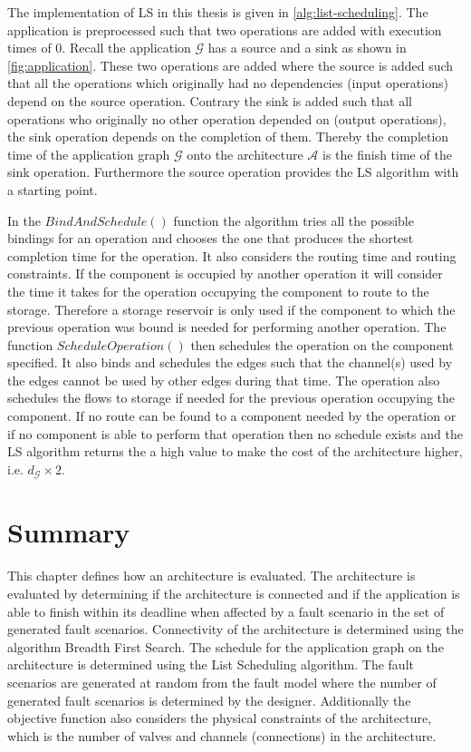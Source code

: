 The implementation of LS in this thesis is given in \autoref{alg:list-scheduling}. The application is preprocessed such that two operations are added with execution times of 0. Recall the application $\mathcal{G}$ has a source and a sink as shown in \autoref{fig:application}. These two operations are added where the source is added such that all the operations which originally had no dependencies (input operations) depend on the source operation. Contrary the sink is added such that all operations who originally no other operation depended on (output operations), the sink operation depends on the completion of them. Thereby the completion time of the application graph $\mathcal{G}$ onto the architecture $\mathcal{A}$ is the finish time of the sink operation. Furthermore the source operation provides the LS algorithm with a starting point.

In the $BindAndSchedule()$ function the algorithm tries all the possible bindings for an operation and chooses the one that produces the shortest completion time for the operation. It also considers the routing time and routing constraints. If the component is occupied by another operation it will consider the time it takes for the operation occupying the component to route to the storage. Therefore a storage reservoir is only used if the component to which the previous operation was bound is needed for performing another operation. The function $ScheduleOperation()$ then schedules the operation on the component specified. It also binds and schedules the edges such that the channel(s) used by the edges cannot be used by other edges during that time. The operation also schedules the flows to storage if needed for the previous operation occupying the component. If no route can be found to a component needed by the operation or if no component is able to perform that operation then no schedule exists and the LS algorithm returns the a high value to make the cost of the architecture higher, i.e. $d_\mathcal{G} \times 2$.


\section{Summary}
This chapter defines how an architecture is evaluated. The architecture is evaluated by determining if the architecture is connected and if the application is able to finish within its deadline when affected by a fault scenario in the set of generated fault scenarios. Connectivity of the architecture is determined using the algorithm Breadth First Search. The schedule for the application graph on the architecture is determined using the List Scheduling algorithm. The fault scenarios are generated at random from the fault model where the number of generated fault scenarios is determined by the designer. Additionally the objective function also considers the physical constraints of the architecture, which is the number of valves and channels (connections) in the architecture.
